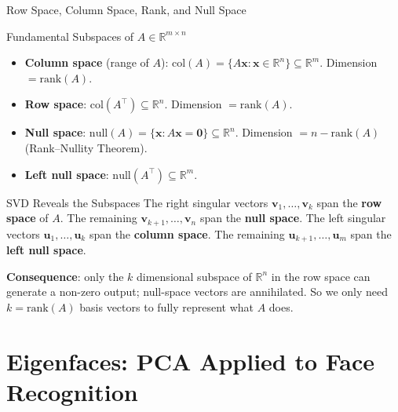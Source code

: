 \documentclass{beamer}
\begin{document}
\begin{frame}[shrink=10]{Row Space, Column Space, Rank, and Null Space}
  \begin{block}{Fundamental Subspaces of $A \in \mathbb{R}^{m \times n}$}
    \begin{itemize}\setlength\itemsep{5pt}
      \item \textbf{Column space} (range of $A$):
            $\mathrm{col}(A) = \{A\mathbf{x} : \mathbf{x} \in \mathbb{R}^n\}
            \subseteq \mathbb{R}^m$.
            Dimension $= \mathrm{rank}(A)$.
      \item \textbf{Row space}: $\mathrm{col}(A^\top) \subseteq \mathbb{R}^n$.
            Dimension $= \mathrm{rank}(A)$.
      \item \textbf{Null space}: $\mathrm{null}(A) = \{\mathbf{x} : A\mathbf{x} = \mathbf{0}\}
            \subseteq \mathbb{R}^n$.
            Dimension $= n - \mathrm{rank}(A)$ (Rank--Nullity Theorem).
      \item \textbf{Left null space}: $\mathrm{null}(A^\top) \subseteq \mathbb{R}^m$.
    \end{itemize}
  \end{block}

  \begin{block}{SVD Reveals the Subspaces}
    The right singular vectors $\mathbf{v}_1,\ldots,\mathbf{v}_k$ span the
    \textbf{row space} of $A$.
    The remaining $\mathbf{v}_{k+1},\ldots,\mathbf{v}_n$ span the
    \textbf{null space}.
    The left singular vectors $\mathbf{u}_1,\ldots,\mathbf{u}_k$ span the
    \textbf{column space}.
    The remaining $\mathbf{u}_{k+1},\ldots,\mathbf{u}_m$ span the
    \textbf{left null space}.

    \medskip

    \textbf{Consequence}: only the $k$ dimensional subspace of $\mathbb{R}^n$
    in the row space can generate a non-zero output; null-space vectors
    are annihilated.
    So we only need $k = \mathrm{rank}(A)$ basis vectors to fully
    represent what $A$ does.
  \end{block}
\end{frame}

\section{Eigenfaces: PCA Applied to Face Recognition}
\end{document}
